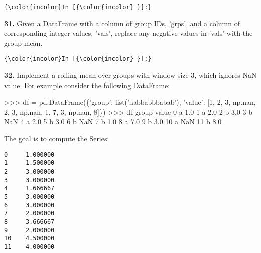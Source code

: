 \documentclass[11pt]{article}
\newenvironment{Shaded}{}{}
\newcommand{\DecValTok}[1]{\textcolor[rgb]{0.25,0.63,0.44}{{#1}}}
\newcommand{\FloatTok}[1]{\textcolor[rgb]{0.25,0.63,0.44}{{#1}}}
\newcommand{\StringTok}[1]{\textcolor[rgb]{0.25,0.44,0.63}{{#1}}}
\newcommand{\NormalTok}[1]{{#1}}
\newcommand{\OperatorTok}[1]{\textcolor[rgb]{0.40,0.40,0.40}{{#1}}}
\newcommand{\BuiltInTok}[1]{{#1}}
\begin{document}
    \begin{Verbatim}[commandchars=\\\{\}]
{\color{incolor}In [{\color{incolor} }]:} 
\end{Verbatim}


    \textbf{31.} Given a DataFrame with a column of group IDs, 'grps', and a
column of corresponding integer values, 'vals', replace any negative
values in 'vals' with the group mean.

    \begin{Verbatim}[commandchars=\\\{\}]
{\color{incolor}In [{\color{incolor} }]:} 
\end{Verbatim}


    \textbf{32.} Implement a rolling mean over groups with window size 3,
which ignores NaN value. For example consider the following DataFrame:

\begin{Shaded}
\begin{Highlighting}[]
\OperatorTok{>>>}\NormalTok{ df }\OperatorTok{=}\NormalTok{ pd.DataFrame(\{}\StringTok{'group'}\NormalTok{: }\BuiltInTok{list}\NormalTok{(}\StringTok{'aabbabbbabab'}\NormalTok{),}
                       \StringTok{'value'}\NormalTok{: [}\DecValTok{1}\NormalTok{, }\DecValTok{2}\NormalTok{, }\DecValTok{3}\NormalTok{, np.nan, }\DecValTok{2}\NormalTok{, }\DecValTok{3}\NormalTok{, }
\NormalTok{                                 np.nan, }\DecValTok{1}\NormalTok{, }\DecValTok{7}\NormalTok{, }\DecValTok{3}\NormalTok{, np.nan, }\DecValTok{8}\NormalTok{]\})}
\OperatorTok{>>>}\NormalTok{ df}
\NormalTok{   group  value}
\DecValTok{0}\NormalTok{      a    }\FloatTok{1.0}
\DecValTok{1}\NormalTok{      a    }\FloatTok{2.0}
\DecValTok{2}\NormalTok{      b    }\FloatTok{3.0}
\DecValTok{3}\NormalTok{      b    NaN}
\DecValTok{4}\NormalTok{      a    }\FloatTok{2.0}
\DecValTok{5}\NormalTok{      b    }\FloatTok{3.0}
\DecValTok{6}\NormalTok{      b    NaN}
\DecValTok{7}\NormalTok{      b    }\FloatTok{1.0}
\DecValTok{8}\NormalTok{      a    }\FloatTok{7.0}
\DecValTok{9}\NormalTok{      b    }\FloatTok{3.0}
\DecValTok{10}\NormalTok{     a    NaN}
\DecValTok{11}\NormalTok{     b    }\FloatTok{8.0}
\end{Highlighting}
\end{Shaded}

The goal is to compute the Series:

\begin{verbatim}
0     1.000000
1     1.500000
2     3.000000
3     3.000000
4     1.666667
5     3.000000
6     3.000000
7     2.000000
8     3.666667
9     2.000000
10    4.500000
11    4.000000
\end{verbatim}
\end{document}
